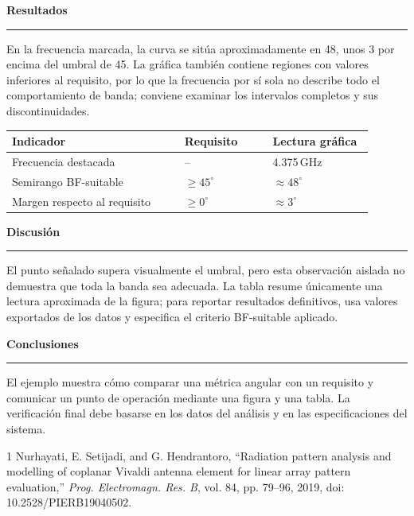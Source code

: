 \documentclass[12pt]{article}
\newcommand{\postercolumnsection}[1]{%
  \vspace{0.6cm plus 1fill}%
  {\color{navy}\fontsize{38}{45}\selectfont\bfseries #1\par}%
  \vspace{0.2cm}%
  {\color{gold}\rule{\linewidth}{2pt}}%
  \vspace{0.35cm}%
}
\begin{document}
\begin{minipage}[t][62cm][s]{0.48\textwidth}
  \postercolumnsection{Resultados}
  En la frecuencia marcada, la curva se sitúa aproximadamente en
  48\textdegree{}, unos 3\textdegree{} por encima del umbral de
  45\textdegree{}. La gráfica también contiene regiones con valores inferiores
  al requisito, por lo que la frecuencia por sí sola no describe todo el
  comportamiento de banda; conviene examinar los intervalos completos y sus
  discontinuidades.

  \begin{center}
    \label{tab:ejemplo}
    {\fontsize{20}{25}\selectfont
    \begin{tabular}{p{0.43\linewidth}p{0.22\linewidth}p{0.25\linewidth}}
      \toprule
      Indicador & Requisito & Lectura gráfica \\
      \midrule
      Frecuencia destacada & -- & 4.375\,GHz \\
      Semirango BF-suitable & $\geq 45^\circ$ & $\approx 48^\circ$ \\
      Margen respecto al requisito & $\geq 0^\circ$ & $\approx 3^\circ$ \\
      \bottomrule
    \end{tabular}}
  \end{center}

  \postercolumnsection{Discusión}
  El punto señalado supera visualmente el umbral, pero esta observación aislada
  no demuestra que toda la banda sea adecuada. La tabla resume únicamente una
  lectura aproximada de la figura; para reportar resultados definitivos, usa
  valores exportados de los datos y especifica el criterio BF-suitable aplicado.

  \postercolumnsection{Conclusiones}
  El ejemplo muestra cómo comparar una métrica angular con un requisito y
  comunicar un punto de operación mediante una figura y una tabla. La
  verificación final debe basarse en los datos del análisis y en las
  especificaciones del sistema.

  {\fontsize{20}{26}\selectfont
  \renewcommand{\refname}{\color{navy}\fontsize{38}{45}\selectfont\bfseries Referencias}
  \begin{thebibliography}{1}
     Nurhayati, E. Setijadi, and G. Hendrantoro,
    ``Radiation pattern analysis and modelling of coplanar Vivaldi antenna
    element for linear array pattern evaluation,'' \emph{Prog. Electromagn.
    Res. B}, vol. 84, pp. 79--96, 2019, doi: 10.2528/PIERB19040502.
  \end{thebibliography}}
\end{minipage}
\end{document}
